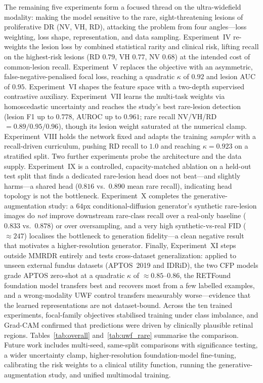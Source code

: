 \documentclass[journal,twoside,web]{ieeecolor}
\begin{document}
The remaining five experiments form a focused thread on the ultra-widefield
modality: making the model sensitive to the rare, sight-threatening lesions of
proliferative DR (NV, VH, RD), attacking the problem from four angles---loss
weighting, loss shape, representation, and data sampling. Experiment~IV re-weights
the lesion loss by combined statistical rarity and clinical risk, lifting recall on
the highest-risk lesions (RD $0.79$, VH $0.77$, NV $0.68$) at the intended cost of
common-lesion recall. Experiment~V replaces the objective with an asymmetric,
false-negative-penalised focal loss, reaching a quadratic $\kappa$ of $0.92$ and
lesion AUC of $0.95$. Experiment~VI shapes the feature space with a two-depth
supervised contrastive auxiliary. Experiment~VII learns the multi-task weights via
homoscedastic uncertainty and reaches the study's best rare-lesion detection
(lesion F1 up to $0.778$, AUROC up to $0.961$; rare recall NV/VH/RD
$=0.89/0.95/0.96$), though its lesion weight saturated at the numerical clamp.
Experiment~VIII holds the network fixed and adapts the training \emph{sampler} with
a recall-driven curriculum, pushing RD recall to $1.0$ and reaching $\kappa=0.923$
on a stratified split. Two further experiments probe the architecture and the data
supply. Experiment~IX is a controlled, capacity-matched ablation on a held-out test
split that finds a dedicated rare-lesion head does not beat---and slightly harms---a
shared head ($0.816$ vs.\ $0.890$ mean rare recall), indicating head topology is not
the bottleneck. Experiment~X completes the generative-augmentation study: a $64$px
conditional-diffusion generator's synthetic rare-lesion images do \emph{not} improve
downstream rare-class recall over a real-only baseline ($0.833$ vs.\ $0.878$) or over
oversampling, and a very high synthetic-vs-real FID ($\approx247$) localises the
bottleneck to generation fidelity---a clean negative result that motivates a
higher-resolution generator. Finally, Experiment~XI steps outside MMRDR entirely and
tests cross-dataset generalization: applied to unseen external fundus datasets
(APTOS~2019 and IDRiD), the two CFP models grade APTOS zero-shot at a quadratic
$\kappa$ of $\approx0.85$--$0.86$, the RETFound foundation model transfers best and
recovers most from a few labelled examples, and a wrong-modality UWF control transfers
measurably worse---evidence that the learned representations are not dataset-bound.
Across the ten trained experiments, focal-family objectives
stabilised training under class imbalance, and Grad-CAM confirmed that predictions
were driven by clinically plausible retinal regions. Tables~\ref{tab:overall}
and~\ref{tab:uwf_rare} summarise the comparison. Future work includes multi-seed,
same-split comparisons with significance testing, a wider uncertainty clamp,
higher-resolution foundation-model fine-tuning, calibrating the risk weights to a
clinical utility function, running the generative-augmentation study, and unified
multimodal training.
\end{document}
